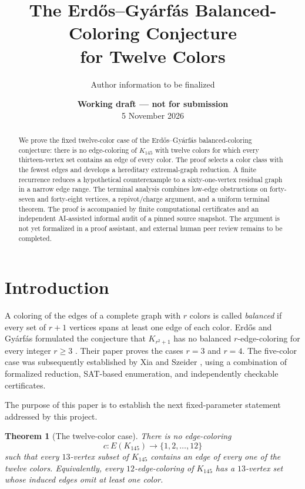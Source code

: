 \documentclass[11pt]{article}
\title{The Erd\H{o}s--Gy\'arf\'as Balanced-Coloring Conjecture\\
for Twelve Colors}
\author{Author information to be finalized}
\date{\textbf{Working draft — not for submission}\\5 November 2026}
\newtheorem{theorem}{Theorem}
\theoremstyle{definition}
\theoremstyle{remark}
\begin{document}
\maketitle

\begin{abstract}
We prove the fixed twelve-color case of the Erd\H{o}s--Gy\'arf\'as
balanced-coloring conjecture: there is no edge-coloring of $K_{145}$ with
twelve colors for which every thirteen-vertex set contains an edge of every
color. The proof selects a color class with the fewest edges and develops a
hereditary extremal-graph reduction. A finite recurrence reduces a
hypothetical counterexample to a sixty-one-vertex residual graph in a narrow
edge range. The terminal analysis combines low-edge obstructions on
forty-seven and forty-eight vertices, a repivot/charge argument, and a
uniform terminal theorem. The proof is accompanied by finite computational
certificates and an independent AI-assisted informal audit of a pinned
source snapshot. The argument is not yet formalized in a proof assistant, and
external human peer review remains to be completed.
\end{abstract}

\section{Introduction}

A coloring of the edges of a complete graph with $r$ colors is called
\emph{balanced} if every set of $r+1$ vertices spans at least one edge of
each color. Erd\H{o}s and Gy\'arf\'as formulated the conjecture that
$K_{r^2+1}$ has no balanced $r$-edge-coloring for every integer $r\geq 3$
\cite{ErdosGyarfas1999}. Their paper proves the cases $r=3$ and $r=4$.
The five-color case was subsequently established by Xia and Szeider
\cite{XiaSzeider2026}, using a combination of formalized reduction,
SAT-based enumeration, and independently checkable certificates.

The purpose of this paper is to establish the next fixed-parameter statement
addressed by this project.

\begin{theorem}[The twelve-color case]
\label{thm:main}
There is no edge-coloring
\[
  c:E(K_{145})\longrightarrow \{1,2,\ldots,12\}
\]
such that every $13$-vertex subset of $K_{145}$ contains an edge of every
one of the twelve colors.
Equivalently, every $12$-edge-coloring of $K_{145}$ has a $13$-vertex set
whose induced edges omit at least one color.
\end{theorem}
\end{document}
